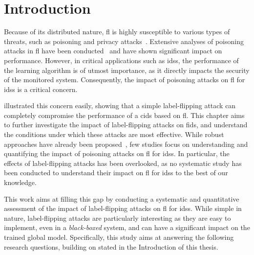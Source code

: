 \section{Introduction\label{sec:assess.intro}}

Because of its distributed nature, \gls{fl} is highly susceptible to various types of threats, such as poisoning and privacy attacks~\cite{rodriguez-barroso_Surveyfederatedlearning_2023}.
Extensive analyses of poisoning attacks in \gls{fl} have been conducted~\cite{bhagoji_AnalyzingFederatedLearning_2019,tolpegin_DataPoisoningAttacks_2020} and have shown significant impact on performance.
However, in critical applications such as \glspl{ids}, the performance of the learning algorithm is of utmost importance, as it directly impacts the security of the monitored system.
Consequently, the impact of poisoning attacks on \gls{fl} for \glspl{ids} is a critical concern.

 illustrated this concern easily, showing that a simple label-flipping attack can completely compromise the performance of a \gls{cids} based on \gls{fl}.
This chapter aims to further investigate the impact of label-flipping attacks on \gls{fids}, and understand the conditions under which these attacks are most effective.
While robust approaches have already been proposed~\cite{yang_Dependablefederatedlearning_2023,vy_FederatedLearningBasedIntrusion_2021,zhang_SecFedNIDSRobustdefense_2022}, few studies focus on understanding and quantifying the impact of poisoning attacks on \gls{fl} for \glspl{ids}.
In particular, the effects of label-flipping attacks has been overlooked, as no systematic study has been conducted to understand their impact on \gls{fl} for \glspl{ids} to the best of our knowledge.

This work aims at filling this gap by conducting a systematic and quantitative assessment of the impact of label-flipping attacks on \gls{fl} for \glspl{ids}.
While simple in nature, label-flipping attacks are particularly interesting as they are easy to implement, even in a \emph{black-boxed} system, and can have a significant impact on the trained global model.
Specifically, this study aims at answering the following research questions, building on  stated in the Introduction of this thesis.

\newcommand{\rqpred}{Is the behavior of poisoning attacks predictable?}
\newcommand{\rqparams}{Do hyperparameters influence the impact of poisoning attacks?}
\newcommand{\rqbackdoor}{Are \gls{ids} backdoors realistic using label-flipping attacks?}
\newcommand{\rqthreshold}{Is there a critical threshold where label-flipping attacks begin to impact performance?}
\newcommand{\rqsim}{Is gradient similarity enough to detect label-flipping attacks?}

